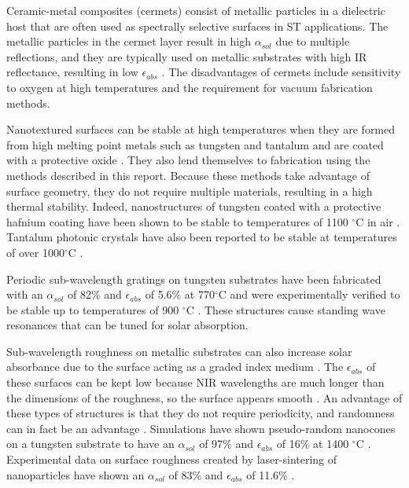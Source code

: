 \documentclass[review]{elsarticle}
\begin{document}
Ceramic-metal composites (cermets) consist of metallic particles in a dielectric host that are often used as spectrally selective surfaces in ST applications.  The metallic particles in the cermet layer result in high $\alpha_{sol}$ due to multiple reflections, and they are typically used on metallic substrates with high IR reflectance, resulting in low $\epsilon_{abs}$ \cite{A2,A4,A5,A6,A7,A8,A9,A10}.  The disadvantages of cermets include sensitivity to oxygen at high temperatures and the requirement for vacuum fabrication methods.

Nanotextured surfaces can be stable at high temperatures when they are 
formed from high melting point metals such as tungsten and tantalum and are coated with a protective oxide \cite{paper1_ref5}.  They also lend themselves to fabrication using the methods described in this report.  Because these methods take advantage of surface geometry, they do not require multiple materials, resulting in a high thermal stability.  Indeed, nanostructures of tungsten coated with a protective hafnium coating have been shown to be stable to temperatures of 1100 $^\circ$C in air \cite{paper1_ref5,Therm_stabil_W_microstructures}.  Tantalum photonic crystals have also been reported to be stable at temperatures of over 1000$^\circ$C \cite{photonic_crystal_rev}.

Periodic sub-wavelength gratings on tungsten substrates have been fabricated with an $\alpha_{sol}$ of 82\% and $\epsilon_{abs}$ of 5.6\% at 770$^\circ$C and were experimentally verified to be 
stable up to temperatures of 900 $^\circ$C \cite{A13}.  These structures cause standing wave resonances that can be tuned for solar absorption.

Sub-wavelength roughness on metallic substrates can also increase solar absorbance due to the surface acting as a graded index medium \cite{A13,A19}.  The $\epsilon_{abs}$ of these surfaces can be kept low because NIR wavelengths are much longer than the dimensions of the roughness, so the surface appears smooth \cite{A14}.  An advantage of these types of structures is that they do not require periodicity, and randomness can in fact be an advantage \cite{me1}.  Simulations have shown pseudo-random nanocones on a tungsten substrate to have an $\alpha_{sol}$ of 97\% and $\epsilon_{abs}$ of 16\% at 1400 $^\circ$C \cite{me1}.  Experimental data on surface roughness created by laser-sintering of nanoparticles have shown an $\alpha_{sol}$ of 83\% and $\epsilon_{abs}$ of 11.6\% \cite{g21}.
\end{document}
